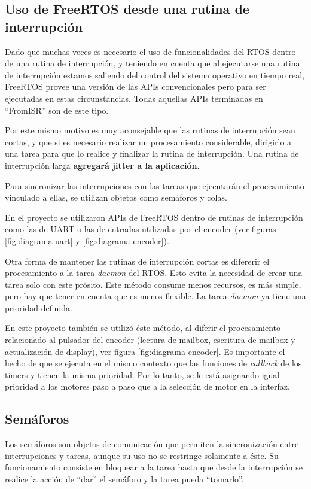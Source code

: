 \documentclass{IEEEtran}
\begin{document}
\subsection{Uso de FreeRTOS desde una rutina de interrupción}
Dado que muchas veces es necesario el uso de funcionalidades del RTOS dentro de una rutina de interrupción, y teniendo en cuenta que al ejecutarse una rutina de interrupción estamos saliendo del control del sistema operativo en tiempo real, FreeRTOS provee una versión de las APIs convencionales pero para ser ejecutadas en estas circunstancias. Todas aquellas APIs terminadas en ``FromISR'' son de este tipo.

Por este mismo motivo es muy aconsejable que las rutinas de interrupción sean cortas, y que si es necesario realizar un procesamiento considerable, dirigirlo a una tarea para que lo realice y finalizar la rutina de interrupción. Una rutina de interrupción larga \textbf{agregará jitter a la aplicación}.

Para sincronizar las interrupciones con las tareas que ejecutarán el procesamiento vinculado a ellas, se utilizan objetos como semáforos y colas.

En el proyecto se utilizaron APIs de FreeRTOS dentro de rutinas de interrupción como las de UART o las de entradas utilizadas por el encoder (ver figuras \ref{fig:diagrama-uart} y \ref{fig:diagrama-encoder}).

Otra forma de mantener las rutinas de interrupción cortas es difererir el procesamiento a la tarea \textit{daemon} del RTOS. Esto evita la necesidad de crear una tarea solo con este prósito. Este método consume menos recursos, es más simple, pero hay que tener en cuenta que es menos flexible. La tarea \textit{daemon} ya tiene una prioridad definida.

En este proyecto también se utilizó éste método, al diferir el procesamiento relacionado al pulsador del encoder (lectura de mailbox, escritura de mailbox y actualización de display), ver figura \ref{fig:diagrama-encoder}. Es importante el hecho de que se ejecuta en el mismo contexto que las funciones de \textit{callback} de los timers y tienen la misma prioridad. Por lo tanto, se le está asignando igual prioridad a los motores paso a paso que a la selección de motor en la interfaz.

\subsection{Semáforos}
Los semáforos son objetos de comunicación que permiten la sincronización entre interrupciones y tareas, aunque su uso no se restringe solamente a éste. Su funcionamiento consiste en bloquear a la tarea hasta que desde la interrupción se realice la acción de ``dar'' el semáforo y la tarea pueda ``tomarlo''.
\end{document}
